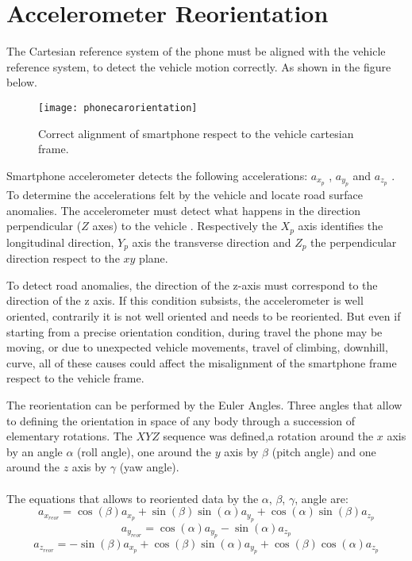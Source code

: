 \documentclass{standalone}
\begin{document}
\section{Accelerometer Reorientation} \label{Accelerometer Reorientation}
\noindent The Cartesian reference system of the phone must be aligned with the vehicle reference system, to detect the vehicle motion correctly.
As shown in the figure below.

\begin{figure}[ht]
  \centering
  \texttt{[image: phonecarorientation]}  
  \caption{Correct alignment of smartphone respect to the vehicle cartesian frame.}
  \label{fig:Smartphone cartesian frame alignment respect Car axis.}
\end{figure}
\noindent Smartphone accelerometer detects the following accelerations: $a_{x_{p}}$ , $a_{y_{p}}$ and $a_{z_{p}}$ . To determine the accelerations felt by the vehicle and locate road surface anomalies. The accelerometer must detect what happens in the direction perpendicular ($Z$ axes) to the vehicle \cite{mohan2008nericell}.
Respectively the $X_{p}$ axis identifies the longitudinal direction, $Y_{p}$ axis the transverse direction and $Z_{p}$ the perpendicular direction respect to the $xy$ plane.

\noindent To detect road anomalies, the direction of the z-axis must correspond to the direction of the z axis. If this condition subsists, the accelerometer is well oriented, contrarily it is not well oriented and needs to be reoriented. But even if starting from a precise orientation condition, during travel the phone may be moving, or due to unexpected vehicle movements, travel of climbing, downhill, curve, all of these causes could affect the misalignment of the smartphone frame respect to the vehicle frame.

\noindent The reorientation can be performed by the Euler Angles. Three angles that allow to defining the orientation in space of any body through a succession of elementary rotations.\cite{diebel2006representing}
The $XYZ$ sequence was defined,a rotation around the $x$ axis by an angle $\alpha$ (roll angle), one around the $y$ axis by $\beta$ (pitch angle) and one around the $z$ axis by  $\gamma$ (yaw angle).\\\\
\noindent The equations that allows to reoriented data by the $\alpha$, $\beta$, $\gamma$, angle are:\cite{Andro}
\begin{equation}
a_{x_{reor}} = \cos (\beta) a_{x_{p}} + \sin (\beta) \sin (\alpha) a_{y_{p}} + \cos (\alpha) \sin (\beta) a_{z_{p}} 
\end{equation}
\begin{equation}
a_{y_{reor}} = \cos (\alpha) a_{y_{p}} - \sin (\alpha) a_{z_{p}}
\end{equation}
\begin{equation}
a_{z_{reor}} = -\sin (\beta) a_{x_{p}} + \cos (\beta) \sin (\alpha) a_{y_{p}} + \cos (\beta) \cos (\alpha) a_{z_{p}}
\end{equation}
\end{document}
